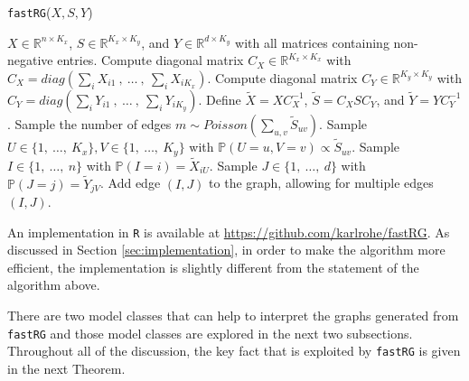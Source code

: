 \documentclass[twoside,11pt]{article}
\begin{document}
\begin{algorithm}
\caption{\texttt{fastRG}($X,S,Y$)}
    \begin{algorithmic}
        \Require $X \in \mathds{R}^{n \times K_x}$, $S \in \mathds{R}^{K_x \times K_y}$, and $Y \in \mathds{R}^{d \times K_y}$  with all matrices containing non-negative entries.
            \State Compute diagonal matrix $C_X \in \mathds{R}^{K_x \times K_x}$ with $C_X=diag(\sum_i X_{i1} \ , \  \dots \ , \ \sum_i X_{iK_x})$.
            \State Compute diagonal matrix $C_Y \in \mathds{R}^{K_y \times K_y}$ with $C_Y=diag(\sum_i Y_{i1} \ , \  \dots \ , \ \sum_i Y_{iK_y})$.
            \State Define $\tilde X = X C_X^{-1}$,  $\tilde S = C_X S C_Y$, and $\tilde Y = Y C_Y^{-1}$.  
            \State Sample the number of edges $m \sim Poisson(\sum_{u,v} \tilde S_{uv})$.
                \State Sample $U \in \{1,\ \dots,\ K_x\}, V \in \{1,\ \dots,\ K_y\}$ with $\mathbb{P}(U = u, V=v) \propto \tilde S_{uv}$.
                \State Sample $I \in \{1,\ \dots,\ n\}$ with $\mathbb{P}(I=i) = \tilde X_{iU}$.
                \State Sample $J \in \{1,\ \dots,\ d\}$ with $\mathbb{P}(J=j) = \tilde Y_{jV}$.
                \State Add edge $(I,J)$ to the graph, allowing for multiple edges $(I,J)$.
            \EndFor
    \end{algorithmic}
\end{algorithm}



An implementation in \texttt{R} is available at \url{https://github.com/karlrohe/fastRG}.  As discussed in Section \ref{sec:implementation}, in order to make the algorithm more efficient, the implementation is slightly different from the statement of the algorithm above.

There are two model classes that can help to interpret the graphs generated from \texttt{fastRG} and those model classes are explored in the next two subsections.  Throughout all of the discussion, the key fact that is exploited by \texttt{fastRG} is given in the next Theorem.
\end{document}
